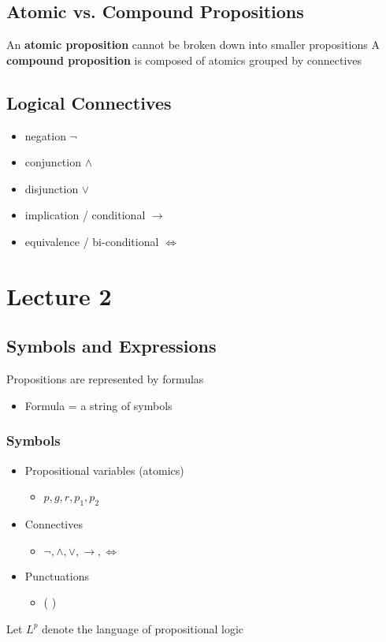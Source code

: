 \documentclass[11pt]{article}
\begin{document}
\subsection{Atomic vs. Compound Propositions}
An \textbf{atomic proposition} cannot be broken down into smaller propositions
A \textbf{compound proposition} is composed of atomics grouped by connectives
\subsection{Logical Connectives}
\begin{itemize}
    \item negation $\neg$
    \item conjunction $\land$
    \item disjunction $\lor$
    \item implication / conditional $\rightarrow$
    \item equivalence / bi-conditional $\iff$
\end{itemize}

\section{Lecture 2}
\subsection{Symbols and Expressions}
Propositions are represented by formulas
\begin{itemize}
    \item Formula = a string of symbols 
\end{itemize}
\subsubsection{Symbols}
\begin{itemize}
    \item Propositional variables (atomics)
    \begin{itemize}
        \item $p, g, r, p_1, p_2$
    \end{itemize}
    \item Connectives 
    \begin{itemize}
        \item $\neg, \land, \lor, \rightarrow, \iff$
    \end{itemize}
    \item Punctuations
    \begin{itemize}
        \item ( )
    \end{itemize}
\end{itemize}
Let $L^p$ denote the language of propositional logic 
\end{document}
